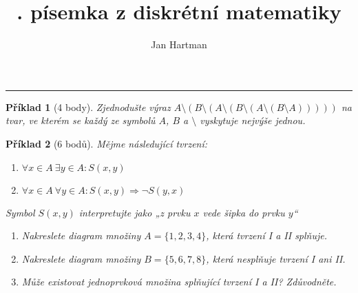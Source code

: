 \documentclass[10pt]{article}
\title{\tutnum. písemka z diskrétní matematiky}
\author{Jan Hartman}
\newcommand{\titlerule}{%
    \noindent %
    \makebox[\textwidth]{\large \thetitle \hfill Jméno: \hspace{4cm}}
    \rule{\textwidth}{0.4pt}%
}
\theoremstyle{definitionstyle}
\theoremstyle{problemstyle}
\newtheorem{problem}{Příklad}
\begin{document}
\titlerule

\begin{problem}[4 body]
Zjednodušte výraz $A \setminus ( B \setminus ( A \setminus ( B \setminus ( A \setminus ( B \setminus A )))))$ na tvar, ve kterém se každý ze symbolů $A$, $B$ a $\setminus$ vyskytuje nejvýše jednou.
\end{problem}

\begin{problem}[6 bodů]
Mějme následující tvrzení:
\begin{enumerate}[label=\Roman*.]
    \item $\forall x \in A \ \exists y \in A : S(x,y)$
    \item $\forall x \in A \ \forall y \in A : S(x,y) \Rightarrow \neg S(y,x)$
\end{enumerate}
Symbol $S(x,y)$ interpretujte jako \textit{„z prvku $x$ vede šipka do prvku $y$“}
\begin{enumerate}[label=(\alph*)]
    \item Nakreslete diagram množiny $A=\{1,2,3,4\}$, která tvrzení I a II splňuje.
    \item Nakreslete diagram množiny $B=\{5,6,7,8\}$, která nesplňuje tvrzení I ani II.
    \item Může existovat jednoprvková množina splňující tvrzení I a II? Zdůvodněte.
\end{enumerate}

\end{problem}
\end{document}

